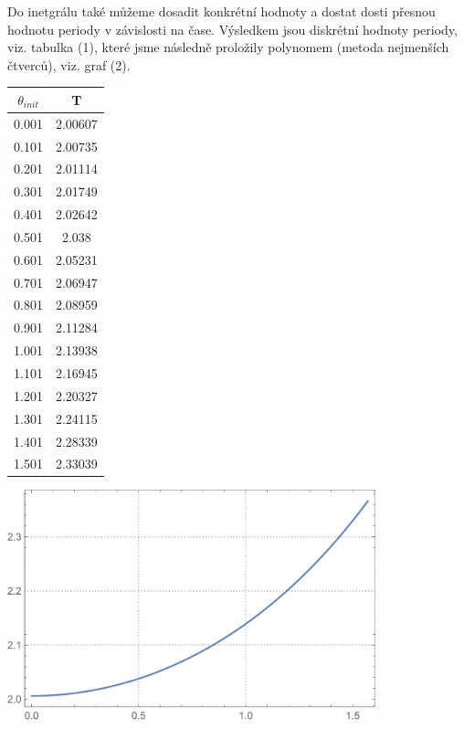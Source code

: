 \documentclass[reqno, a4paper]{amsart}
\begin{document}
Do inetgrálu také můžeme dosadit konkrétní hodnoty a dostat dosti přesnou hodnotu periody v závislosti na čase. Výsledkem jsou diskrétní hodnoty periody, viz. tabulka (1), které jsme následně proložily polynomem (metoda nejmenších čtverců), viz. graf (2). 

\vspace{5mm}

\begin{minipage}{\textwidth}
\begin{minipage}[b]{0.2\textwidth}
\centering
\begin{tabular}{|c|c|}
\hline
$\theta_{init}$ & T \\ 
\hline
0.001& 2.00607\\0.101& 2.00735\\0.201& 2.01114\\0.301& 2.01749\\0.401& 2.02642\\0.501& 2.038\\0.601& 2.05231\\0.701& 2.06947\\0.801& 2.08959\\0.901& 2.11284\\
1.001& 2.13938\\1.101& 2.16945\\1.201& 2.20327\\1.301& 2.24115\\1.401& 2.28339\\1.501& 2.33039\\
\hline
\end{tabular}
\end{minipage}
\begin{minipage}[b]{0.79\textwidth}
\centering
\includegraphics[width=0.8\textwidth]{Elipticky integral, Perioda}
\end{minipage}
\hfill
\end{minipage}
\end{document}
